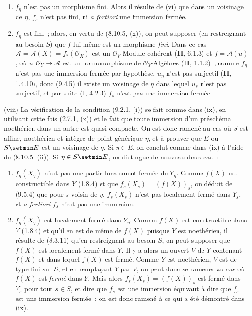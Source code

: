\begin{enumerate}[label=\upshape{$\arabic{enumi}^\circ$}]
  \item $f_\eta$ n'est pas un morphisme fini. Alors il résulte de (vi) que dans
  un voisinage de $\eta$, $f_s$ n'est pas fini, ni \emph{a fortiori} une
  immersion fermée.

  \item $f_\eta$ est fini~; alors, en vertu de (8.10.5, (x)), on peut supposer
  (en restreignant au besoin $S$) que $f$ lui-même est un morphisme \emph{fini}.
  Dans ce cas $\mathcal A=\mathcal A(X)=f_*(\mathcal O_X)$ est un
  $\mathcal O_Y$-Module cohérent (\textbf{II}, 6.1.3) et
  $f=\mathcal A(u)$, où $u:\mathcal O_Y\to\mathcal A$ est un homomorphisme de
  $\mathcal O_Y$-Algèbres (\textbf{II}, 1.1.2)~; comme $f_\eta$ n'est pas une
  immersion fermée par hypothèse, $u_\eta$ n'est pas surjectif (\textbf{II},
  1.4.10), donc (9.4.5) il existe un voisinage de $\eta$ dans lequel $u_s$
  n'est pas surjectif, et par suite (\textbf{I}, 4.2.3) $f_s$ n'est pas une
  immersion fermée.
\end{enumerate}

(viii) La vérification de la condition (9.2.1, (i)) se fait comme dans (ix), en
utilisant cette fois (2.7.1, (x)) et le fait que toute immersion d'un préschéma
noethérien dans un autre est quasi-compacte. On est donc ramené au cas où $S$
est affine, noethérien et intègre de point générique $\eta$, et à prouver que
$E$ ou $S\setmin E$ est un voisinage de $\eta$. Si $\eta\in E$, on conclut comme dans
(ix) à l'aide de (8.10.5, (ii)). Si $\eta\in S\setmin E$, on distingue de nouveau
deux cas~:

\begin{enumerate}[label=\upshape{$\arabic{enumi}^\circ$}]
  \item{} $f_\eta(X_\eta)$ n'est pas une partie localement fermée de $Y_\eta$.
  Comme $f(X)$ est constructible dans $Y$ (1.8.4) et que
  $f_s(X_s)=(f(X))_s$, on déduit de (9.5.4) que pour $s$ voisin de $\eta$,
  $f_s(X_s)$ n'est pas localement fermé dans $Y_s$, et \emph{a fortiori}
  $f_s$ n'est pas une immersion.

  \item $f_\eta(X_\eta)$ est localement fermé dans $Y_\eta$.
  Comme $f(X)$ est constructible dans $Y$ (1.8.4) et qu'il en est de même de
  $\overline{f(X)}$ puisque $Y$ est noethérien, il résulte de (8.3.11) qu'en
  restreignant au besoin $S$, on peut supposer que $f(X)$ est localement fermé
  dans $Y$. Il y a alors un ouvert $V$ de $Y$ contenant $f(X)$ et dans lequel
  $f(X)$ est fermé. Comme $Y$ est noethérien, $V$ est de type fini sur $S$, et
  en remplaçant $Y$ par $V$, on peut donc se ramener au cas où $f(X)$ est
  \emph{fermé} dans $Y$. Mais alors $f_s(X_s)=(f(X))_s$ est fermé dans $Y_s$
  pour tout $s\in S$, et dire que $f_s$ est une immersion équivaut à dire que
  $f_s$ est une immersion fermée~; on est donc ramené à ce qui a été démontré
  dans (ix).
\end{enumerate}

